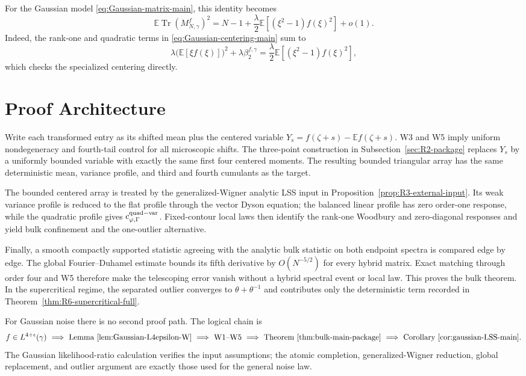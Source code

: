 \documentclass[11pt]{article}
\theoremstyle{definition}
\theoremstyle{remark}
\newcommand{\E}{\mathbb E}
\newcommand{\Tr}{\operatorname{Tr}}
\begin{document}
For the Gaussian model \eqref{eq:Gaussian-matrix-main}, this identity becomes
\[
 \E\Tr(M_{N,\gamma}^f)^2
 =N-1+\frac{\lambda}{2}
 \E\!\left[(\xi^2-1)f(\xi)^2\right]+o(1).
\]
Indeed, the rank-one and quadratic terms in
\eqref{eq:Gaussian-centering-main} sum to
\[
 \lambda\bigl(\E[\xi f(\xi)]\bigr)^2
 +\lambda\beta_2^{f,\gamma}
 =\frac{\lambda}{2}\E\!\left[(\xi^2-1)f(\xi)^2\right],
\]
which checks the specialized centering directly.
\section{Proof Architecture}\label{sec:proof-overview}

Write each transformed entry as its shifted mean plus the centered variable
$Y_s=f(\zeta+s)-\E f(\zeta+s)$.  W3 and W5 imply uniform nondegeneracy and
fourth-tail control for all microscopic shifts.  The three-point construction
in Subsection~\ref{sec:R2-package} replaces $Y_s$ by a uniformly bounded variable
with exactly the same first four centered moments.  The resulting bounded
triangular array has the same deterministic mean, variance profile, and third
and fourth cumulants as the target.

The bounded centered array is treated by the generalized-Wigner analytic LSS
input in Proposition~\ref{prop:R3-external-input}.  Its weak variance profile
is reduced to the flat profile through the vector Dyson equation; the balanced
linear profile has zero order-one response, while the quadratic profile gives
$c_{\varphi,\Gamma}^{\rm quad-var}$.  Fixed-contour local laws then identify
the rank-one Woodbury and zero-diagonal responses and yield bulk confinement
and the one-outlier alternative.

Finally, a smooth compactly supported statistic agreeing with the analytic
bulk statistic on both endpoint spectra is compared edge by edge.  The global
Fourier--Duhamel estimate bounds its fifth derivative by $O(N^{-5/2})$ for
every hybrid matrix.  Exact matching through order four and W5 therefore make
the telescoping error vanish without a hybrid spectral event or local law.
This proves the bulk theorem.  In the supercritical regime, the separated
outlier converges to $\theta+\theta^{-1}$ and contributes only the deterministic
term recorded in Theorem~\ref{thm:R6-supercritical-full}.

For Gaussian noise there is no second proof path.  The logical chain is
\[
 f\in L^{4+\epsilon}(\gamma)
 \ \Longrightarrow\ 
 \text{Lemma~\ref{lem:Gaussian-L4epsilon-W}}
 \ \Longrightarrow\ 
 \text{W1--W5}
 \ \Longrightarrow\ 
 \text{Theorem~\ref{thm:bulk-main-package}}
 \ \Longrightarrow\ 
 \text{Corollary~\ref{cor:gaussian-LSS-main}}.
\]
The Gaussian likelihood-ratio calculation verifies the input assumptions;
the atomic completion, generalized-Wigner reduction, global replacement, and
outlier argument are exactly those used for the general noise law.
\end{document}
